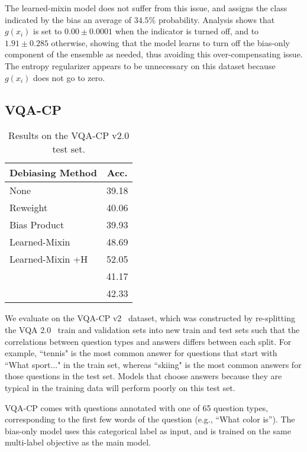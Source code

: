 \documentclass[11pt,a4paper]{article}
\begin{document}
The learned-mixin model does not suffer from this issue, and assigns the class indicated by the bias an average of $34.5\%$ probability. Analysis shows that $g(x_i)$ is set to $0.00 \pm 0.0001$ when the indicator is turned off, and to $1.91 \pm 0.285$ otherwise, showing that the model learns to turn off the bias-only component of the ensemble as needed, thus avoiding this over-compensating issue. The entropy regularizer appears to be unnecessary on this dataset because $g(x_i)$ does not go to zero.

\subsection{VQA-CP}
\label{sect:vqap_cp}

\begin{table}
\centering
\tablefont
\begin{tabular}{lc} \toprule
Debiasing Method & Acc. \\ \midrule
None & 39.18\\
Reweight & 40.06\\
Bias Product & 39.93\\
Learned-Mixin & 48.69\\
Learned-Mixin +H & 52.05\\ \hdashline
\citet{ramakrishnan2018overcoming} & 41.17\\
\citet{grand2019adversarial} & 42.33\\
\bottomrule
\end{tabular}
\caption{Results on the VQA-CP v2.0 test set.}
\label{tab:vqa_results}
\end{table}

 We evaluate on the VQA-CP v2~\cite{vqa_cp} dataset, which was constructed by re-splitting the VQA 2.0~\cite{vqa2} train and validation sets into new train and test sets such that the correlations between question types and answers differs between each split. For example, ``tennis" is the most common answer for questions that start with ``What sport..." in the train set, whereas ``skiing" is the most common answers for those questions in the test set. Models that choose answers because they are typical in the training data will perform poorly on this test set.

 VQA-CP comes with questions annotated with one of 65 question types, corresponding to the first few words of the question (e.g., ``What color is''). The bias-only model uses this categorical label as input, and is trained on the same multi-label objective as the main model.
\end{document}

